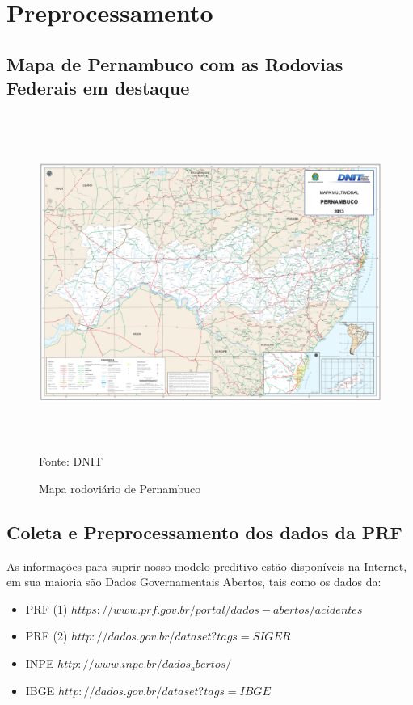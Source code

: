 \chapter{Preprocessamento}\label{pre}


\section{Mapa de Pernambuco com as Rodovias Federais em destaque}

\begin{figure}[ht]
	\centering
	\caption{Mapa rodoviário de Pernambuco}
	\includegraphics[width=150mm, height=110mm]{Figuras/Anexos/Mapa-pe.pdf}\\
	\tiny Fonte: DNIT
\end{figure}


\section{Coleta e Preprocessamento dos dados da PRF}\label{intro:Anexo}


As informações para suprir nosso modelo preditivo estão disponíveis na Internet, em sua maioria são Dados Governamentais Abertos, tais como os dados
da:
\begin{itemize}
	\item PRF (1) $ https://www.prf.gov.br/portal/dados-abertos/acidentes $
	\item PRF (2) $ http://dados.gov.br/dataset?tags=SIGER$
	\item INPE $ http://www.inpe.br/dados_abertos/ $ 
	\item IBGE $ http://dados.gov.br/dataset?tags=IBGE $
\end{itemize}

